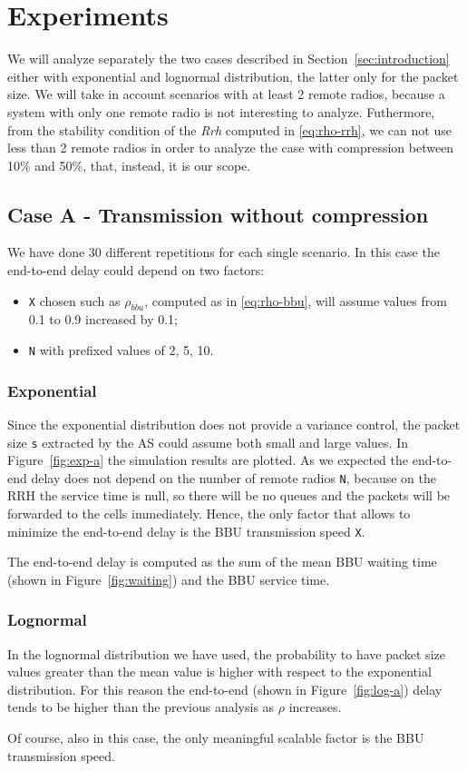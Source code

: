 \documentclass[11pt,a4paper,oneside, openright]{article}
\begin{document}
\section{Experiments}
We will analyze separately the two cases described in Section~\ref{sec:introduction} either with exponential and lognormal distribution, the latter only for the packet size.
We will take in account scenarios with at least 2 remote radios, because a system with only one remote radio is not interesting to analyze. Futhermore, from the stability condition of the \textit{Rrh} computed in \eqref{eq:rho-rrh}, we can not use less than 2 remote radios in order to analyze the case with compression between 10\% and 50\%, that, instead, it is our scope.

\subsection{Case A - Transmission without compression}
We have done 30 different repetitions for each single scenario. In this case the end-to-end delay could depend on two factors:
\begin{itemize}
	\item \texttt{X} chosen such as $ \rho_{bbu} $, computed as in \eqref{eq:rho-bbu}, will assume values from 0.1 to 0.9 increased by 0.1;
	\item \texttt{N} with prefixed values of 2, 5, 10.
\end{itemize}
\subsubsection{Exponential}
Since the exponential distribution does not provide a variance control, the packet size \texttt{s} extracted by the AS could assume both small and large values.
In Figure~\ref{fig:exp-a} the simulation results are plotted.
As we expected the end-to-end delay does not depend on the number of remote radios \texttt{N}, because on the RRH the service time is null, so there will be no queues and the packets will be forwarded to the cells immediately.
Hence, the only factor that allows to minimize the end-to-end delay is the BBU transmission speed \texttt{X}.

The end-to-end delay is computed as the sum of the mean BBU waiting time (shown in Figure~\ref{fig:waiting}) and the BBU service time.

\subsubsection{Lognormal}
In the lognormal distribution we have used, the probability to have packet size values greater than the mean value is higher with respect to the exponential distribution. For this reason the end-to-end (shown in Figure~\ref{fig:log-a}) delay tends to be higher than the previous analysis as $\rho$ increases.

Of course, also in this case, the only meaningful scalable factor is the BBU transmission speed.
\end{document}
